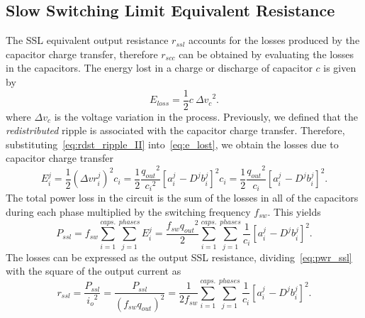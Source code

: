 
\subsection[SSL Equivalent Resistance ]{Slow Switching Limit Equivalent Resistance}
The SSL equivalent output resistance $r_{ssl}$ accounts for the losses produced by the capacitor charge transfer, therefore $r_{scc}$ can be obtained by evaluating the losses in the capacitors.  The energy lost in a charge or discharge of capacitor $c$ is given by
\begin{equation}
E_{loss}=\frac{1}{2} c ~{\Delta{v}_c}^2 .
\label{eq:e_lost}
\end{equation}
where $\Delta v_c$ is the voltage variation in the process. Previously, we defined that the \emph{redistributed} ripple is associated with the capacitor charge transfer. Therefore, substituting~\eqref{eq:rdst_ripple_II} into~\eqref{eq:e_lost}, we obtain the losses due to capacitor charge transfer
\begin{equation}
E_i^j=\frac{1}{2}{({\Delta{vr}}_i^j)}^2 c_i = \frac{1}{2}\frac{{q_{out}}^2}{{c_i}^2}{\left[a_{i\
}^j-{D^j} {b_i^j}\right]}^2c_i=\frac{1}{2}\frac{{q_{out}}^2}{c_i}{\left[a_{i\
}^j-{D^j} {b_i^j}\right]}^2 .
\label{eq:e_lost_ssl}
\end{equation}
The total power loss in the circuit is the sum of the losses in all of the capacitors during each phase multiplied by the switching frequency $f_{sw}$. This yield{\small s}
\begin{equation}
P_{ssl}= f_{sw} \sum_{i=1}^{caps.}\sum_{j=1}^{phases} E_i^j =\frac{f_{sw}{q_{out}}^2}{2}\sum_{i=1}^{caps.}\sum_{j=1}^{phases}\frac{1}{c_i}{\left[a_{i\
}^j-{D^j}{b_i^j}\right]}^2.
\label{eq:pwr_ssl}
\end{equation}
The losses can be expressed as the output SSL resistance, dividing~\eqref{eq:pwr_ssl} with the
square of the output current as
\begin{equation}
r_{ssl}=\frac{P_{ssl}}{{i_o}^2}=\frac{P_{ssl}}{{(f_{sw} {q_{out}})}^2}=\frac{1}{2 f_{sw}}\sum_{i=1}^{caps.}\sum_{j=1}^{phases}\frac{1}{c_i}{\left[a_{i\
}^j-{D^j} {b_i^j}\right]}^2.
\label{eq:r_ssl}
\end{equation}


